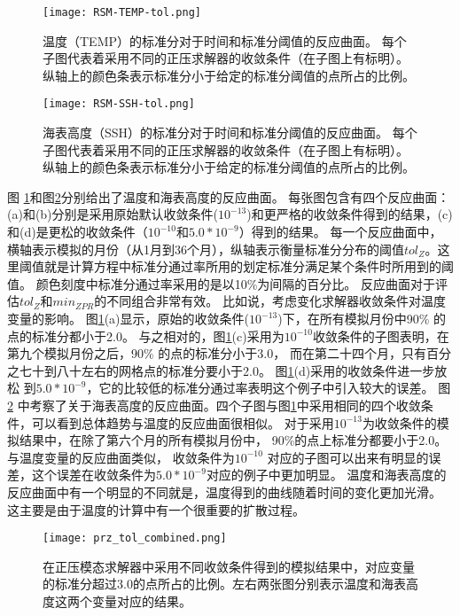 \begin {figure} 
\centering
\texttt{[image: RSM-TEMP-tol.png]}
\caption {温度（TEMP）的标准分对于时间和标准分阈值的反应曲面。 每个子图代表着采用不同的正压求解器的收敛条件（在子图上有标明）。纵轴上的颜色条表示标准分小于给定的标准分阈值的点所占的比例。}
\label{fig:RSM-TEMP-tol}
\end {figure}
 
\begin {figure} 
\centering
\texttt{[image: RSM-SSH-tol.png]}
\caption {海表高度（SSH）的标准分对于时间和标准分阈值的反应曲面。 每个子图代表着采用不同的正压求解器的收敛条件（在子图上有标明）。纵轴上的颜色条表示标准分小于给定的标准分阈值的点所占的比例。}
\label{fig:RSM-SSH-tol}
\end {figure}

图 \ref{fig:RSM-TEMP-tol}和图\ref{fig:RSM-SSH-tol}分别给出了温度和海表高度的反应曲面。 
每张图包含有四个反应曲面：(a)和(b)分别是采用原始默认收敛条件($10^{-13}$)和更严格的收敛条件得到的结果，(c)和(d)是更松的收敛条件（$10^{-10}$和$5.0*10^{-9}$）得到的结果。 
每一个反应曲面中，横轴表示模拟的月份（从1月到36个月），纵轴表示衡量标准分分布的阈值$tol_{Z}$。这里阈值就是计算方程中标准分通过率所用的划定标准分满足某个条件时所用到的阈值。
颜色刻度中标准分通过率采用的是以10\%为间隔的百分比。 
反应曲面对于评估$tol_{Z}$和$min_{ZPR}$的不同组合非常有效。
比如说，考虑变化求解器收敛条件对温度变量的影响。 
图\ref{fig:RSM-TEMP-tol}(a)显示，原始的收敛条件($10^{-13}$)下，在所有模拟月份中90\% 的点的标准分都小于2.0。
与之相对的，图\ref{fig:RSM-TEMP-tol}(c)采用为$10^{-10}$收敛条件的子图表明，在第九个模拟月份之后，90\% 的点的标准分小于3.0， 而在第二十四个月，只有百分之七十到八十左右的网格点的标准分要小于2.0。
图\ref{fig:RSM-TEMP-tol}(d)采用的收敛条件进一步放松 到$5.0*10^{-9}$，它的比较低的标准分通过率表明这个例子中引入较大的误差。
图\ref{fig:RSM-SSH-tol} 中考察了关于海表高度的反应曲面。四个子图与图\ref{fig:RSM-TEMP-tol}中采用相同的四个收敛条件，可以看到总体趋势与温度的反应曲面很相似。 
对于采用$10^{-13}$为收敛条件的模拟结果中，在除了第六个月的所有模拟月份中， 90\%的点上标准分都要小于2.0。 
与温度变量的反应曲面类似， 收敛条件为$10^{-10}$ 对应的子图可以出来有明显的误差，这个误差在收敛条件为$5.0*10^{-9}$对应的例子中更加明显。 
温度和海表高度的反应曲面中有一个明显的不同就是，温度得到的曲线随着时间的变化更加光滑。 这主要是由于温度的计算中有一个很重要的扩散过程。

 

\begin{figure} 
\centering 
\texttt{[image: prz\_tol\_combined.png]}
\caption { 
  在正压模态求解器中采用不同收敛条件得到的模拟结果中，对应变量的标准分超过3.0的点所占的比例。左右两张图分别表示温度和海表高度这两个变量对应的结果。}
\label {fig:PRZ-tol}
\end{figure}

